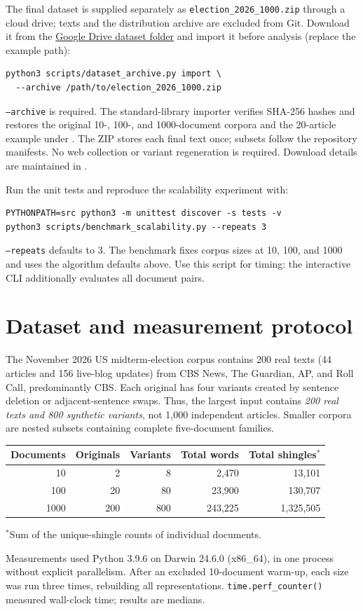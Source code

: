 \documentclass[11pt,a4paper]{article}
\begin{document}
The final dataset is supplied separately as
\texttt{election\_2026\_1000.zip} through a cloud drive; texts and the
distribution archive are excluded from Git. Download it from the
\href{https://drive.google.com/drive/folders/12gJchd3Gv5oO9GsbdZrfX5CRR0VNfaGZ}{Google Drive dataset folder}
and import it
before analysis (replace the example path):
\begin{lstlisting}
python3 scripts/dataset_archive.py import \
  --archive /path/to/election_2026_1000.zip
\end{lstlisting}
\texttt{--archive} is required. The standard-library importer verifies
SHA-256 hashes and restores the original 10-, 100-, and 1000-document
corpora and the 20-article example under
. The ZIP stores each final text once;
subsets follow the repository manifests. No web collection or variant
regeneration is required. Download details are maintained in
.

Run the unit tests and reproduce the scalability experiment with:
\begin{lstlisting}
PYTHONPATH=src python3 -m unittest discover -s tests -v
python3 scripts/benchmark_scalability.py --repeats 3
\end{lstlisting}
\texttt{--repeats} defaults to 3. The benchmark fixes corpus sizes at
10, 100, and 1000 and uses the algorithm defaults above. Use this script
for timing: the interactive CLI additionally evaluates all document pairs.

\section{Dataset and measurement protocol}
The November 2026 US midterm-election corpus contains 200 real texts
(44 articles and 156 live-blog updates) from CBS News, The Guardian,
AP, and Roll Call, predominantly CBS. Each original has four variants
created by sentence deletion or adjacent-sentence swaps. Thus, the largest
input contains \emph{200 real texts and 800 synthetic variants}, not
1,000 independent articles. Smaller corpora are nested subsets containing
complete five-document families.

\begin{center}
\small
\begin{tabular}{@{}rrrrr@{}}
\toprule
Documents & Originals & Variants & Total words & Total shingles$^{*}$ \\
\midrule
10   & 2   & 8   & 2,470   & 13,101 \\
100  & 20  & 80  & 23,900  & 130,707 \\
1000 & 200 & 800 & 243,225 & 1,325,505 \\
\bottomrule
\end{tabular}

\footnotesize $^{*}$Sum of the unique-shingle counts of individual documents.
\end{center}
Measurements used Python 3.9.6 on Darwin 24.6.0 (x86\_64), in one process
without explicit parallelism. After an excluded 10-document warm-up,
each size was run three times, rebuilding all representations.
\texttt{time.perf\_counter()} measured wall-clock time; results are medians.
\end{document}
